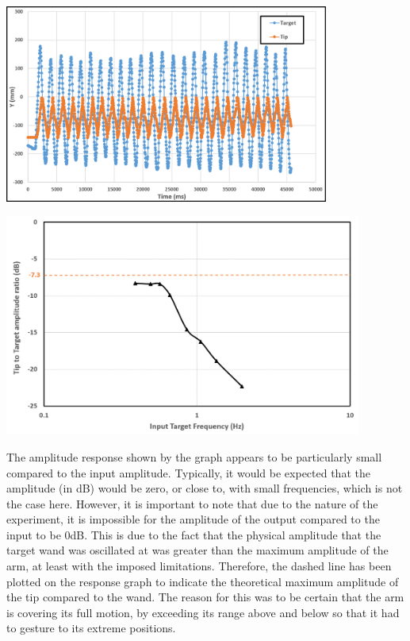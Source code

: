 \documentclass[11pt]{article}
\begin{document}
\begin{center}
\includegraphics[width=0.8\textwidth]{images/responseExample.png}
\label{figure:responseExample}
\end{center}


\begin{center}
\includegraphics[width=0.88\textwidth]{images/amplitudeResponse.png}
\label{figure:amplitudeResponse}
\end{center}

The amplitude response shown by the graph appears to be particularly small compared to the input amplitude. Typically, it would be expected that the amplitude (in dB) would be zero, or close to, with small frequencies, which is not the case here. However, it is important to note that due to the nature of the experiment, it is impossible for the amplitude of the output compared to the input to be 0dB. This is due to the fact that the physical amplitude that the target wand was oscillated at was greater than the maximum amplitude of the arm, at least with the imposed limitations. Therefore, the dashed line has been plotted on the response graph to indicate the theoretical maximum amplitude of the tip compared to the wand. The reason for this was to be certain that the arm is covering its full motion, by exceeding its range above and below so that it had to gesture to its extreme positions.
\end{document}
